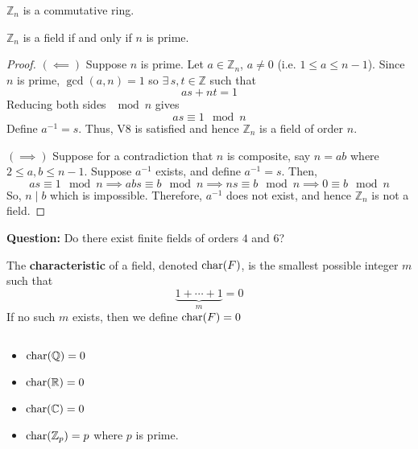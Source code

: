\begin{thmbox}
    \begin{theorem}
        $ \mathbb{Z}_n $ is a commutative ring.
    \end{theorem}
\end{thmbox}

\begin{thmbox}
    \begin{theorem}
        $ \mathbb{Z}_n $ is a field if and only if $ n $ is prime.
    \end{theorem}
\end{thmbox}

\begin{proof}
    $ (\impliedby) $ Suppose $ n $ is prime. Let $ a\in\mathbb{Z}_n $, $ a\neq 0 $
    (i.e. $ 1\leqslant a\leqslant n-1 $). Since $ n $ is prime, $ \gcd(a,n)=1 $
    so $ \exists\,s,t\in\mathbb{Z} $ such that
    \[ as+nt=1 \]
    Reducing both sides $ \mod n $ gives
    \[ as\equiv 1 \mod n \]
    Define $ a^{-1}=s $. Thus, V8 is satisfied and hence $ \mathbb{Z}_n $
    is a field of order $ n $.

    $ (\implies) $ Suppose for a contradiction that $ n $ is composite, say $ n=ab $
    where $ 2\leqslant a,b\leqslant n-1 $. Suppose $ a^{-1} $ exists, and define
    $ a^{-1}=s $. Then,
    \[ as\equiv 1 \mod n\implies abs\equiv b\mod n\implies ns\equiv b \mod n
        \implies 0\equiv b\mod n \]
    So, $ n\mid b $ which is impossible. Therefore, $ a^{-1} $ does not exist, and hence
    $ \mathbb{Z}_n $ is not a field.
\end{proof}

\textbf{Question:} Do there exist finite fields of orders $ 4 $ and $ 6 $?

\begin{defbox}
    \begin{definition}
        The \textbf{characteristic} of a field, denoted $ \operatorname{char}(F) $, is the smallest
        possible integer $ m $ such that
        \[ \underbrace{1+\cdots+1}_{m}=0 \]
        If no such $ m $ exists, then we define $ \operatorname{char}(F)=0 $
    \end{definition}
\end{defbox}

\begin{exbox}
    \begin{example} $ \; $
        \begin{itemize}
            \item $ \operatorname{char}(\mathbb{Q})=0 $
            \item $ \operatorname{char}(\mathbb{R})=0 $
            \item $ \operatorname{char}(\mathbb{C})=0 $
            \item $ \operatorname{char}(\mathbb{Z}_p)=p $ where $ p $ is prime.
        \end{itemize}
    \end{example}
\end{exbox}

